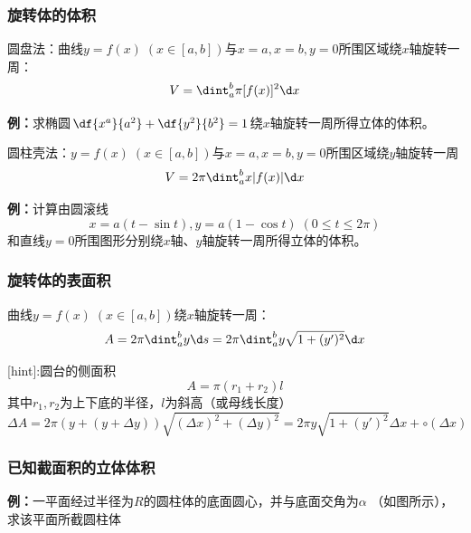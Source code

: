 \subsubsection{旋转体的体积}

圆盘法：曲线$y=f(x)\;(x\in[a,b])$与$x=a,x=b,y=0$所围区域绕$x$轴旋转一周：
$$V=\dint_a^b\pi[f(x)]^2\d x$$

{\bf 例：}求椭圆$\df{x^a}{a^2}+\df{y^2}{b^2}=1$绕$x$轴旋转一周所得立体的体积。

圆柱壳法：$y=f(x)\;(x\in[a,b])$与$x=a,x=b,y=0$所围区域绕$y$轴旋转一周
$$V=2\pi\dint_a^bx|f(x)|\d x$$

{\bf 例：}计算由圆滚线$$x=a(t-\sin t),y=a(1-\cos t)\;(0\leq t\leq 2\pi)$$
和直线$y=0$所围图形分别绕$x$轴、$y$轴旋转一周所得立体的体积。

\subsubsection{旋转体的表面积}
曲线$y=f(x)\;(x\in[a,b])$绕$x$轴旋转一周：
$$A=2\pi \dint_a^by\d s=2\pi \dint_a^by\sqrt{1+(y')^2}\d x$$

[hint]:圆台的侧面积
$$A=\pi(r_1+r_2)l$$
其中$r_1,r_2$为上下底的半径，$l$为斜高（或母线长度）
$$\Delta A=2\pi(y+(y+\Delta y))\sqrt{(\Delta x)^2+(\Delta y)^2}
=2\pi y\sqrt{1+(y')^2}\Delta x+\circ(\Delta x)$$

\subsubsection{已知截面积的立体体积}

{\bf 例：}一平面经过半径为$R$的圆柱体的底面圆心，并与底面交角为$\alpha$
（如图所示），求该平面所截圆柱体

\begin{center}
\end{center}

